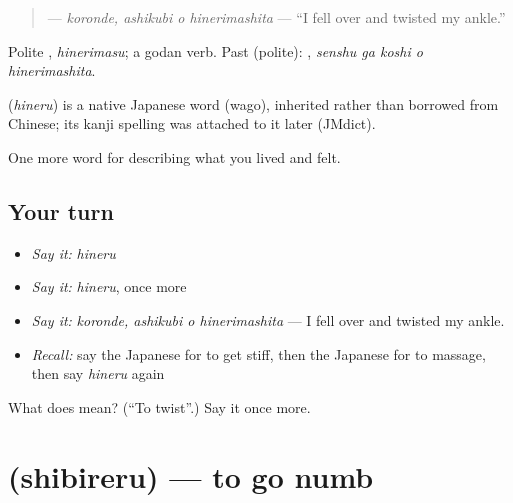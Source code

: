 \begin{quote}
\textbf{ } — \emph{koronde, ashikubi o hinerimashita} — \textquotedblleft{}I fell over and twisted my ankle.\textquotedblright{}
\end{quote}

Polite \textbf{}, \emph{hinerimasu}; a godan verb. Past (polite): \textbf{  }, \emph{senshu ga koshi o hinerimashita}.

\begin{cousinweb}
\textbf{} (\emph{hineru}) is a native Japanese word (wago), inherited rather than borrowed from Chinese; its kanji spelling was attached to it later (JMdict).
\end{cousinweb}

\begin{grammarlens}[title={What you've built}]
One more word for describing what you lived and felt.
\end{grammarlens}

\subsection*{Your turn}
\begin{itemize}
\raggedright
  \item \emph{Say it:} \emph{hineru}
  \item \emph{Say it:} \emph{hineru}, once more
  \item \emph{Say it:} \emph{koronde, ashikubi o hinerimashita} — I fell over and twisted my ankle.
  \item \emph{Recall:} say the Japanese for to get stiff, then the Japanese for to massage, then say \emph{hineru} again
\end{itemize}

\begin{tcolorbox}[breakable,colback=teal!4,colframe=teal!35!black,title={Before you move on}]
What does  mean? (\textquotedblleft{}To twist\textquotedblright{}.) Say it once more.
\end{tcolorbox}
\section[\texorpdfstring{\ja{しびれる} (shibireru)}{しびれる (shibireru)}]{ (shibireru) — to go numb}

\label{lesson:JA-C448-shibireru}



